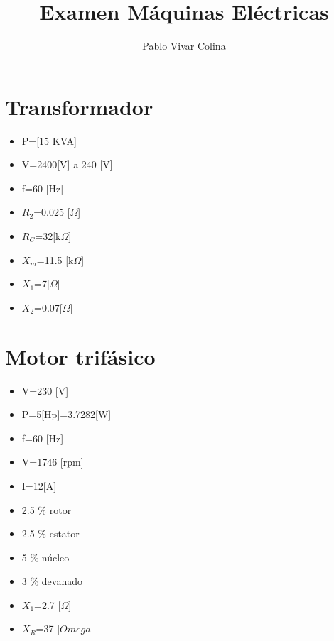 \documentclass[]{article}
\title{Examen Máquinas Eléctricas}
\author{Pablo Vivar Colina}
\begin{document}
	

\maketitle





\section{Transformador}

\begin{multicols}{2}
	\begin{itemize}
		\item P=[15 KVA]
		\item V=2400[V] a 240 [V]
		\item f=60 [Hz]
		\item $R_2$=0.025 [$\Omega$]
		\item $R_C$=32[k$\Omega$]
		\item $X_m$=11.5 [k$\Omega$]
		\item $X_1$=7[$\Omega$]
		\item $X_2$=0.07[$\Omega$]
	\end{itemize}
\end{multicols}

\section{Motor trifásico}

\begin{multicols}{2}
	\begin{itemize}
		\item V=230 [V]
		\item P=5[Hp]=3.7282[W]
		\item f=60 [Hz]
		\item V=1746 [rpm]
		\item I=12[A]
		\item 2.5 $\%$ rotor
		\item 2.5 $\%$ estator
		\item 5 $\%$ núcleo
		\item 3 $\%$ devanado
		\item $X_1$=2.7 [$\Omega$]
		\item $X_R$=37 [$Omega$]
	\end{itemize}

\end{multicols}
\end{document}
